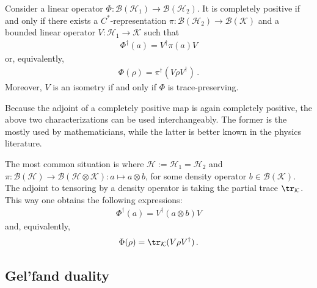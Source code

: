     \begin{theorem}[Stinespring]\label{operators:stinespring}
        Consider a linear operator $\Phi:\mathcal{B}(\mathcal{H}_1)\rightarrow\mathcal{B}(\mathcal{H}_2)$. It is completely positive if and only if there exists a $C^*$-representation $\pi:\mathcal{B}(\mathcal{H}_2)\rightarrow\mathcal{B}(\mathcal{K})$ and a bounded linear operator $V:\mathcal{H}_1\rightarrow\mathcal{K}$ such that
        \begin{gather}
            \Phi^\dagger(a) = V^\dag\pi(a)V
        \end{gather}
        or, equivalently,
        \begin{gather}
            \Phi(\rho) = \pi^\dagger(V\rho V^\dagger)\,.
        \end{gather}
        Moreover, $V$ is an isometry if and only if $\Phi$ is trace-preserving.
    \end{theorem}
    \begin{remark}
        Because the adjoint of a completely positive map is again completely positive, the above two characterizations can be used interchangeably. The former is the mostly used by mathematicians, while the latter is better known in the physics literature.

        The most common situation is where $\mathcal{H}:=\mathcal{H}_1=\mathcal{H}_2$ and $\pi:\mathcal{B}(\mathcal{H})\rightarrow\mathcal{B}(\mathcal{H}\otimes\mathcal{K}):a\mapsto a\otimes b$, for some density operator $b\in\mathcal{B}(\mathcal{K})$. The adjoint to tensoring by a density operator is taking the partial trace $\tr_{\mathcal{K}}$. This way one obtains the following expressions:
        \begin{gather}
            \Phi^\dagger(a) = V^\dag(a\otimes b)V
        \end{gather}
        and, equivalently,
        \begin{gather}
            \Phi(\rho) = \tr_{\mathcal{K}}(V\rho V^\dagger)\,.
        \end{gather}
    \end{remark}

\subsection{Gel'fand duality}

